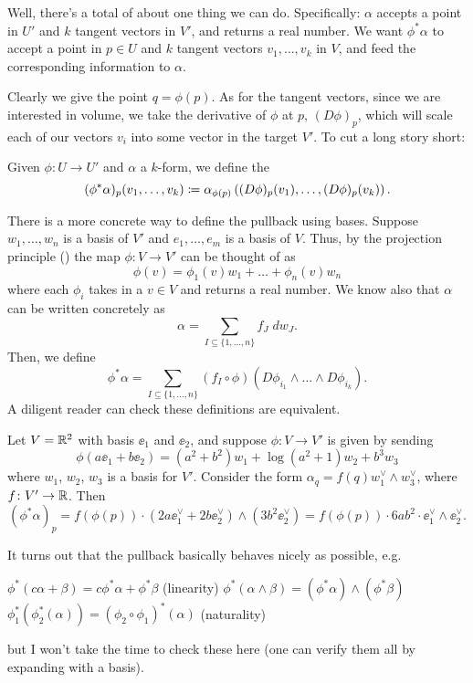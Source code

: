 Well, there's a total of about one thing we can do.
Specifically: $\alpha$ accepts a point in $U'$ and $k$ tangent vectors in $V'$,
and returns a real number.
We want $\phi^\ast \alpha$ to accept a point in $p \in U$
and $k$ tangent vectors $v_1, \dots, v_k$ in $V$,
and feed the corresponding information to $\alpha$.

Clearly we give the point $q = \phi(p)$.
As for the tangent vectors, since we are interested in volume, we take the
derivative of $\phi$ at $p$, $(D\phi)_p$, which will scale each of our vectors $v_i$
into some vector in the target $V'$.
To cut a long story short:
\begin{definition}
	Given $\phi \colon U \to U'$ and $\alpha$ a $k$-form, we define the 
	\[
		(\phi^\ast \alpha)_p(v_1, \dots, v_k)
		\coloneqq \alpha_{\phi(p)}
		\left( (D\phi)_p(v_1), \dots, (D\phi)_p(v_k) \right).
	\]
\end{definition}

There is a more concrete way to define the pullback using bases.
Suppose $w_1, \dots, w_n$ is a basis of $V'$
and $e_1, \dots, e_m$ is a basis of $V$.
Thus, by the projection principle ()
the map $\phi \colon V \to V'$ can be thought of as
\[ \phi(v) = \phi_1(v) w_1 + \dots + \phi_n(v) w_n \]
where each $\phi_i$ takes in a $v \in V$ and returns a real number.
We know also that $\alpha$ can be written concretely as
\[ \alpha = \sum_{I \subseteq \{1, \dots, n\}} f_J \; dw_J. \]
Then, we define
\[
	\phi^\ast\alpha
	= \sum_{I \subseteq \{1, \dots, n\}}
	(f_I \circ \phi) (D\phi_{i_1} \wedge \dots \wedge D\phi_{i_k}).
\]
A diligent reader can check these definitions are equivalent.
\begin{example}
	Let $V = \mathbb R^2$ with basis $\ee_1$ and $\ee_2$,
	and suppose $\phi \colon V \to V'$ is given by sending
	\[ \phi(a\ee_1 + b\ee_2) = (a^2+b^2)w_1 + \log(a^2+1) w_2 + b^3 w_3 \]
	where $w_1$, $w_2$, $w_3$ is a basis for $V'$.
	Consider the form $\alpha_q = f(q) w_1^\vee \wedge w_3^\vee$, where $f \colon V' \to \mathbb R$.
	Then
	\[ (\phi^\ast\alpha)_p = f(\phi(p)) \cdot (2a \ee_1^\vee + 2b\ee_2^\vee) \wedge (3b^2 \ee_2^\vee)
		= f(\phi(p)) \cdot 6ab^2 \cdot \ee_1^\vee \wedge \ee_2^\vee. \]
\end{example}

It turns out that the pullback basically behaves nicely as possible, e.g.\
\begin{itemize}
	\ii $\phi^\ast(c\alpha + \beta) = c\phi^\ast \alpha + \phi^\ast\beta$ (linearity)
	\ii $\phi^\ast(\alpha\wedge\beta)
	= (\phi^\ast \alpha)\wedge(\phi^\ast \beta)$
	\ii $\phi_1^\ast(\phi_2^\ast(\alpha))
	= (\phi_2 \circ \phi_1)^\ast(\alpha)$ (naturality)
\end{itemize}
but I won't take the time to check these here
(one can verify them all by expanding with a basis).

